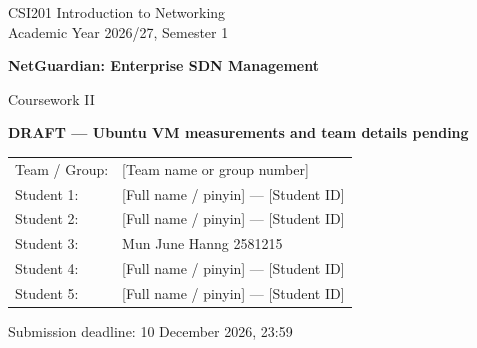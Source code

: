 \onecolumn
{}
\begin{titlepage}
\centering
\vspace*{2cm}
{\Large CSI201 Introduction to Networking\\[0.3cm]
Academic Year 2026/27, Semester 1\par}
\vspace{1.8cm}
{\huge\bfseries NetGuardian: Enterprise SDN Management\par}
\vspace{0.5cm}
{\Large Coursework II\par}
\vspace{1.2cm}
{\Large\color{red}\bfseries DRAFT --- Ubuntu VM measurements and team details pending\par}
\vspace{1.5cm}
\begin{tabular}{ll}
Team / Group: & [Team name or group number] \\
Student 1: & [Full name / pinyin] --- [Student ID] \\
Student 2: & [Full name / pinyin] --- [Student ID] \\
Student 3: & Mun June Hanng 2581215 \\
Student 4: & [Full name / pinyin] --- [Student ID] \\
Student 5: & [Full name / pinyin] --- [Student ID] \\
\end{tabular}
\vfill
Submission deadline: 10 December 2026, 23:59\par
\end{titlepage}
\clearpage
{}
\setcounter{page}{1}
\twocolumn
